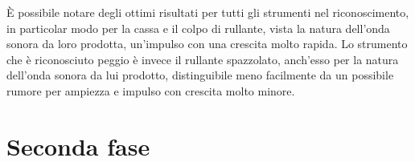 È possibile notare degli ottimi risultati per tutti gli strumenti nel riconoscimento, in particolar modo per la cassa e il colpo di rullante, vista la natura dell'onda sonora da loro prodotta, un'impulso con una crescita molto rapida. Lo strumento che è riconosciuto peggio è invece il rullante spazzolato, anch'esso per la natura dell'onda sonora da lui prodotto, distinguibile meno facilmente da un possibile rumore per ampiezza e impulso con crescita molto minore.\section{Seconda fase}